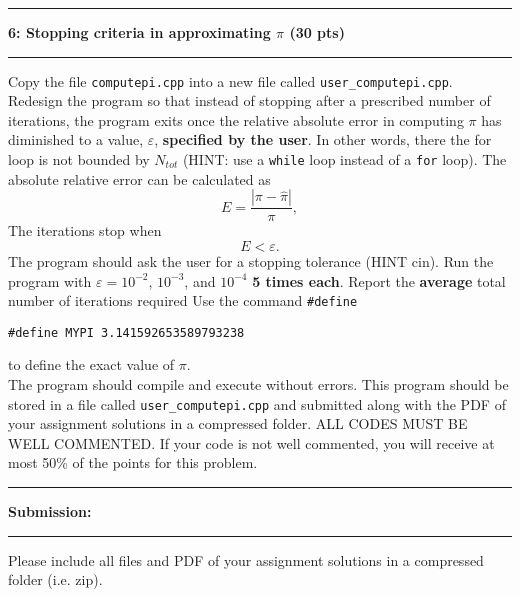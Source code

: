 \documentclass[11pt]{article}
\newcommand\question[2]{\vspace{.25in}\hrule\textbf{#1: #2}\vspace{.5em}\hrule\vspace{.10in}}
\begin{document}
\newpage
\question{6}{Stopping criteria in approximating $\pi$ (30 pts)}
Copy the file \texttt{computepi.cpp} into a new file called
\texttt{user\_computepi.cpp}. Redesign the program so that instead of stopping
after a prescribed number of iterations, the program exits once the relative
absolute error in computing $\pi$ has diminished to a value, $\varepsilon$,
\textbf{specified by the user}. In other words, there the for loop is not bounded by $N_{tot}$
(HINT: use a \texttt{while} loop instead of a \texttt{for} loop). The absolute relative error can be calculated as
\begin{equation*}
    E = \frac{|\pi - \hat{\pi}|}{\pi},
\end{equation*}
The iterations stop when
\begin{equation*}
    E < \varepsilon.
\end{equation*}
The program should ask the user for a stopping tolerance (HINT cin). Run the program with $\varepsilon =  10^{-2}$,
$10^{-3}$, and $10^{-4}$ \textbf{5 times each}. Report the \textbf{average} total number of iterations required Use the command \texttt{\#define} \\
\begin{center}
    \texttt{\#define MYPI 3.141592653589793238}
\end{center}
to define the exact value of $\pi$. \\[1cm]
\vspace{5pt}
The program should compile and execute without errors. This program
should be stored in a file called \texttt{user\_computepi.cpp} and submitted along with the PDF of your assignment solutions in a compressed folder. ALL CODES MUST BE WELL COMMENTED. If your code is not well commented, you will receive at most 50\% of the points for this problem.

\question{Submission}{}
Please include all files and PDF of your assignment solutions in a compressed folder (i.e. zip).
\end{document}
